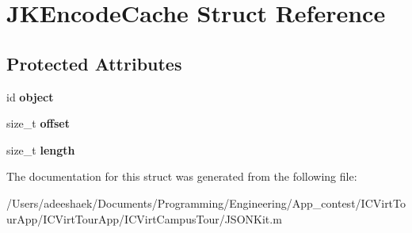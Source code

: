 \hypertarget{struct_j_k_encode_cache}{\section{J\-K\-Encode\-Cache Struct Reference}
\label{struct_j_k_encode_cache}
}
\subsection*{Protected Attributes}
\begin{DoxyCompactItemize}
\item 
\hypertarget{struct_j_k_encode_cache_a0d2bb04646dae94e58a3d0392a0c37f2}{id {\bfseries object}}\label{struct_j_k_encode_cache_a0d2bb04646dae94e58a3d0392a0c37f2}

\item 
\hypertarget{struct_j_k_encode_cache_aadb6d6eb83e646653a1402032e45dcab}{size\-\_\-t {\bfseries offset}}\label{struct_j_k_encode_cache_aadb6d6eb83e646653a1402032e45dcab}

\item 
\hypertarget{struct_j_k_encode_cache_ae809d5359ac030c60a30a8f0b2294b82}{size\-\_\-t {\bfseries length}}\label{struct_j_k_encode_cache_ae809d5359ac030c60a30a8f0b2294b82}

\end{DoxyCompactItemize}


The documentation for this struct was generated from the following file\-:\begin{DoxyCompactItemize}
\item 
/\-Users/adeeshaek/\-Documents/\-Programming/\-Engineering/\-App\-\_\-contest/\-I\-C\-Virt\-Tour\-App/\-I\-C\-Virt\-Tour\-App/\-I\-C\-Virt\-Campus\-Tour/J\-S\-O\-N\-Kit.\-m\end{DoxyCompactItemize}
